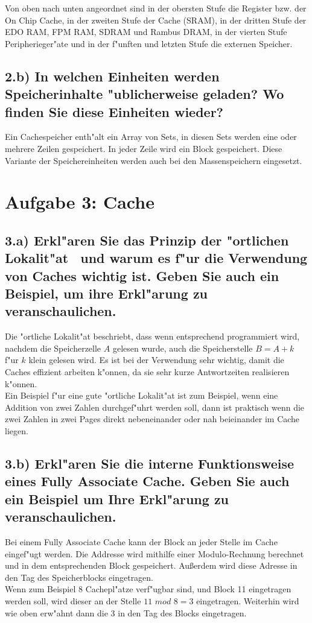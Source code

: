 \documentclass{article}
\begin{document}
Von oben nach unten angeordnet sind in der obersten Stufe die Register bzw. der 
On Chip Cache, in der zweiten Stufe der Cache (SRAM), in der dritten Stufe der 
EDO RAM, FPM RAM, SDRAM und Rambus DRAM, in der vierten Stufe 
Peripherieger"ate und in der f"unften und letzten Stufe die externen Speicher.   

\subsection*{2.b) In welchen Einheiten werden Speicherinhalte 
"ublicherweise geladen? Wo finden Sie diese Einheiten wieder?}
Ein Cachespeicher enth"alt ein Array von Sets, in diesen Sets werden eine oder 
mehrere Zeilen gespeichert. In jeder Zeile wird ein Block gespeichert. Diese 
Variante der Speichereinheiten werden auch bei den Massenspeichern eingesetzt.  

\section*{Aufgabe 3: Cache}
\subsection*{3.a) Erkl"aren  Sie das Prinzip der \dq "ortlichen Lokalit"at\dq 
~und warum es f"ur die Verwendung von Caches wichtig ist. Geben Sie auch 
ein Beispiel, um ihre Erkl"arung zu veranschaulichen.}
Die "ortliche Lokalit"at beschriebt, dass wenn entsprechend programmiert wird, 
nachdem die Speicherzelle $A$ gelesen wurde, auch die Speicherstelle $B=A+k$ 
f"ur $k$ klein gelesen wird. Es ist bei der Verwendung sehr wichtig, damit die 
Caches effizient arbeiten k"onnen, da sie sehr kurze Antwortzeiten realisieren 
k"onnen. \\

Ein Beispiel f"ur eine gute "ortliche Lokalit"at ist zum Beispiel, wenn eine Addition 
von zwei Zahlen durchgef"uhrt werden soll, dann ist praktisch wenn die zwei 
Zahlen in zwei Pages direkt nebeneinander oder nah beieinander im Cache 
liegen.  

\subsection*{3.b) Erkl"aren Sie die interne Funktionsweise eines \dq Fully 
Associate Cache\dq . Geben Sie auch ein Beispiel um Ihre Erkl"arung zu 
veranschaulichen.}
Bei einem Fully Associate Cache kann der Block an jeder Stelle im Cache eingef"ugt 
werden. Die Addresse wird mithilfe einer Modulo-Rechnung berechnet und in dem 
entsprechenden Block gespeichert. Au\ss erdem wird diese Adresse in den Tag 
des Speicherblocks eingetragen. \\

Wenn zum Beispiel 8 Cachepl"atze verf"ugbar sind, und Block 11 eingetragen 
werden soll, wird dieser an der Stelle $11\,\, mod\,\, 8 = 3$ eingetragen. 
Weiterhin 
wird wie oben erw"ahnt dann die 3 in den Tag des Blocks eingetragen. 
\end{document}
